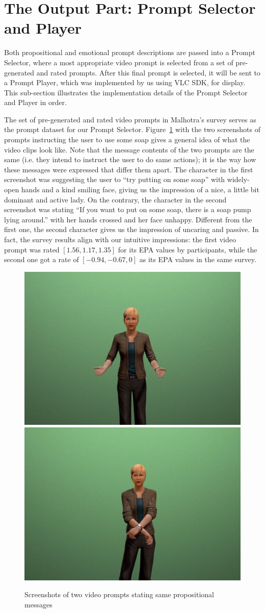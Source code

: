 \section{The Output Part: Prompt Selector and Player}

Both propositional and emotional prompt descriptions are passed into a Prompt Selector, where a most appropriate video prompt is selected from a set of pre- generated and rated prompts. After this final prompt is selected, it will be sent to a Prompt Player, which was implemented by us using VLC SDK, for display. This sub-section illustrates the implementation details of the Prompt Selector and Player in order.

The set of pre-generated and rated video prompts in Malhotra's survey \cite{malhotra2014} serves as the prompt dataset for our Prompt Selector. Figure~\ref{fig:sample-prompt} with the two screenshots of prompts instructing the user to use some soap gives a general idea of what the video clips look like. Note that the message contents of the two prompts are the same (i.e. they intend to instruct the user to do same actions); it is the way how these messages were expressed that differ them apart. The character in the first screenshot was suggesting the user to ``try putting on some soap'' with widely-open hands and a kind smiling face, giving us the impression of a nice, a little bit dominant and active lady. On the contrary, the character in the second screenshot was stating ``If you want to put on some soap, there is a soap pump lying around.'' with her hands crossed and her face unhappy. Different from the first one, the second character gives us the impression of uncaring and passive. In fact, the survey results align with our intuitive impressions: the first video prompt was rated $[1.56, 1.17, 1.35]$ for its EPA values by participants, while the second one got a rate of  $[-0.94, -0.67, 0]$ as its EPA values in the same survey.


%
\begin{figure}[htb]
\centering
\includegraphics[width=0.45\linewidth]{fig/prompt1.jpg}
\includegraphics[width=0.45\linewidth]{fig/prompt2.jpg}
\caption{Screenshots of two video prompts stating same propositional messages}
\label{fig:sample-prompt}
\end{figure}

